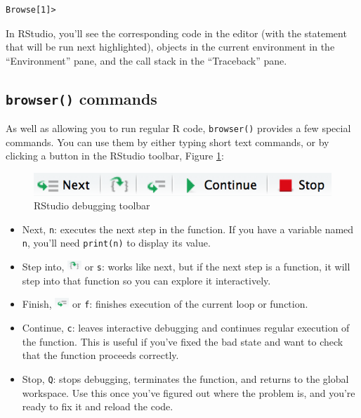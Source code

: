 \documentclass[]{book}
\begin{document}
\begin{verbatim}
Browse[1]> 
\end{verbatim}

In RStudio, you'll see the corresponding code in the editor (with the statement that will be run next highlighted), objects in the current environment in the ``Environment'' pane, and the call stack in the ``Traceback'' pane.

\hypertarget{browser-commands}{%
\subsection{\texorpdfstring{\texttt{browser()} commands}{browser() commands}}\label{browser-commands}}

As well as allowing you to run regular R code, \texttt{browser()} provides a few special commands. You can use them by either typing short text commands, or by clicking a button in the RStudio toolbar, Figure \ref{fig:debug-toolbar}:

\begin{figure}

{\centering \includegraphics[width=0.5\linewidth]{screenshots/debug-toolbar} 

}

\caption{RStudio debugging toolbar}\label{fig:debug-toolbar}
\end{figure}

\begin{itemize}
\item
  Next, \texttt{n}: executes the next step in the function. If you have a
  variable named \texttt{n}, you'll need \texttt{print(n)} to display its value.
\item
  Step into, \includegraphics[width=0.20833in,height=\textheight]{screenshots/step-into.png} or \texttt{s}:
  works like next, but if the next step is a function, it will step into that
  function so you can explore it interactively.
\item
  Finish, \includegraphics[width=0.20833in,height=\textheight]{screenshots/finish-loop.png} or \texttt{f}:
  finishes execution of the current loop or function.
\item
  Continue, \texttt{c}: leaves interactive debugging and continues regular execution
  of the function. This is useful if you've fixed the bad state and want to
  check that the function proceeds correctly.
\item
  Stop, \texttt{Q}: stops debugging, terminates the function, and returns to the global
  workspace. Use this once you've figured out where the problem is, and you're
  ready to fix it and reload the code.
\end{itemize}
\end{document}
